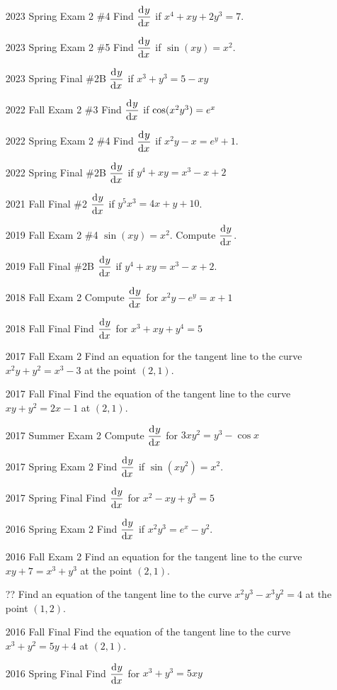 \documentclass[10pt]{scrartcl}
\theoremstyle{definition}
\begin{document}
\begin{enumerate}
\item[2023 Spring Exam 2 \#4] Find $\dod{y}{x}$ if $x^4+xy+2y^3=7$.
\item[2023 Spring Exam 2 \#5] Find $\dod{y}{x}$ if $\sin(xy)=x^2$.
\item[2023 Spring Final \#2B] $\dod{y}{x}$ if $x^3+y^3 = 5-xy$
\item[2022 Fall Exam 2 \#3] Find $\dod{y}{x}$ if $\cosine(x^2y^3) = e^x$
\item[2022 Spring Exam 2 \#4] Find $\dod{y}{x}$ if $x^2y - x = e^y + 1$.
\item[2022 Spring Final \#2B] $\dod yx$ if $y^4+xy = x^3-x+2$
\item[2021 Fall Final \#2] $\dod yx$ if $y^5x^3 = 4x+y+10$.
\item[2019 Fall Exam 2 \#4] $\sin(xy) = x^2$. Compute $\dod yx$.
\item[2019 Fall Final \#2B] $\dod yx$ if $y^4 + xy = x^3-x+2$.
\item[2018 Fall Exam 2] Compute $\dod{y}{x}$ for $x^2y - e^y = x + 1$
\item[2018 Fall Final] Find $\dod{y}{x}$ for $x^3 + xy + y^4 = 5$
\item[2017 Fall Exam 2] Find an equation for the tangent line to the curve $x^2 y + y^2 = x^3 - 3$ at the point $(2, 1)$.
\item[2017 Fall Final] Find the equation of the tangent line to the curve $xy + y^2 = 2x - 1$ at $(2, 1)$.
\item[2017 Summer Exam 2] Compute $\dod{y}{x}$ for $3xy^2 = y^3 - \cos x$
\item[2017 Spring Exam 2] Find $\dod{y}{x}$ if $\sin(xy^2) = x^2$.
\item[2017 Spring Final] Find $\dod yx$ for $x^2 - xy + y^3 = 5$
\item[2016 Spring Exam 2] Find $\dod yx$ if $x^2y^3 = e^x - y^2$.
\item[2016 Fall Exam 2] Find an equation for the tangent line to the curve $xy + 7 = x^3 + y^3$ at the point $(2, 1)$.
\item[??] Find an equation of the tangent line to the curve $x^2 y^3 - x^3 y^2 = 4$ at the point $(1, 2)$.
\item[2016 Fall Final] Find the equation of the tangent line to the curve $x^3 + y^2 = 5y + 4$ at $(2, 1)$.
\item[2016 Spring Final] Find $\dod yx$ for $x^3 + y^3 = 5xy$
\end{enumerate}
\end{document}
